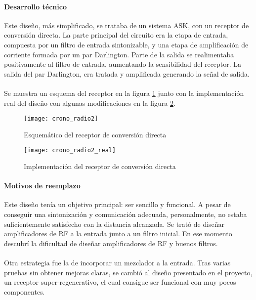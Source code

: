 \paragraph{Desarrollo técnico}
Este diseño, más simplificado, se trataba de un sistema ASK, con un receptor de conversión directa. 
La parte principal del circuito era la etapa de entrada, compuesta por un filtro de entrada sintonizable, y una etapa de amplificación de corriente formada por un par Darlington. Parte de la salida se realimentaba positivamente al filtro de entrada, aumentando la sensibilidad del receptor. La salida del par Darlington, era tratada y amplificada generando la señal de salida. 
\paragraph{}
Se muestra un esquema del receptor en la figura \ref{fig:crono_radio2} junto con la implementaci\'on real del diseño con algunas modificaciones en la figura \ref{fig:crono_radio2_real}.
\begin{figure}[h!]
    \centering
    \texttt{[image: crono\_radio2]}
    \caption{Esquem\'atico del receptor de conversi\'on directa}
    \label{fig:crono_radio2}
\end{figure}

\begin{figure}[h!]
    \centering
    \texttt{[image: crono\_radio2\_real]}
    \caption{Implementaci\'on del receptor de conversi\'on directa}
    \label{fig:crono_radio2_real}
\end{figure}

\paragraph{Motivos de reemplazo}
Este diseño tenía un objetivo principal: ser sencillo y funcional.
A pesar de conseguir una sintonización y comunicación adecuada, personalmente, no estaba suficientemente satisfecho con la distancia alcanzada. Se trató de diseñar amplificadores de RF a la entrada junto a un filtro inicial. En ese momento descubrí la dificultad de diseñar amplificadores de RF y buenos filtros. 
\paragraph{}
Otra estrategia fue la de incorporar un mezclador a la entrada. Tras varias pruebas sin obtener mejoras claras, se cambió al diseño presentado en el proyecto, un receptor super-regenerativo, el cual consigue ser funcional con muy pocos componentes.
